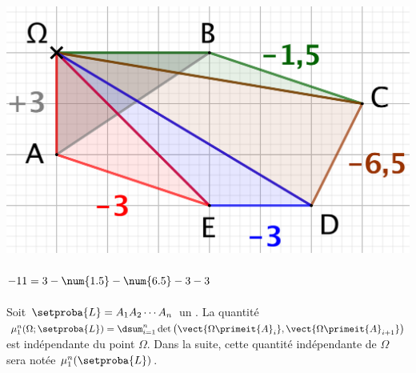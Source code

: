\begin{multicols}{2}
\begin{center}
        \includegraphics[scale=.35]{convex-2.png}

           \smallskip

        $- 11 = 3 - \num{1.5} - \num{6.5} - 3 - 3 \vphantom{\dfrac{2^M}2}$
    \end{center}
\end{multicols}




\begin{fact} \label{sarea-pt-ct}
    Soit $\setproba{L} = A_1 A_2 \cdots A_n$ un \ncycle.
    La quantité
    $\mu_1^n (\Omega ;\setproba{L}) = \dsum_{i=1}^{n} \det \big( \vect{\Omega \primeit{A}_i} , \vect{\Omega \primeit{A}_{i+1}} \big)$
    est indépendante du point $\Omega$.
    Dans la suite, cette quantité indépendante de $\Omega$ sera notée $\mu_1^n (\setproba{L})$.
\end{fact}



